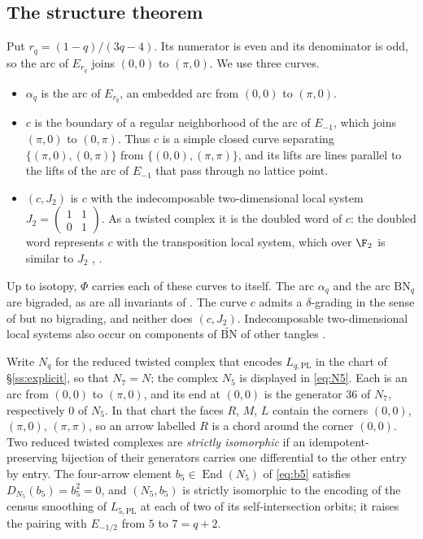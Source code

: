 \subsection{The structure theorem}\label{ss:kh-structure}
Put $r_q=(1-q)/(3q-4)$.  Its numerator is even and its denominator is odd, so the arc of $E_{r_q}$
joins $(0,0)$ to $(\pi,0)$.  We use three curves.
\begin{itemize}
\item $\alpha_q$ is the arc of $E_{r_q}$, an embedded arc from $(0,0)$ to $(\pi,0)$.
\item $c$ is the boundary of a regular neighborhood of the arc of $E_{-1}$, which joins $(\pi,0)$ to
 $(0,\pi)$.  Thus $c$ is a simple closed curve separating $\{(\pi,0),(0,\pi)\}$ from
 $\{(0,0),(\pi,\pi)\}$, and its lifts are lines parallel to the lifts of the arc of $E_{-1}$ that
 pass through no lattice point.
\item $(c,J_2)$ is $c$ with the indecomposable two-dimensional local system
 $J_2=\left(\begin{smallmatrix}1&1\\0&1\end{smallmatrix}\right)$.  As a twisted complex it is the
 doubled word of $c$: the doubled word represents $c$ with the transposition local system, which over
 $\F_2$ is similar to $J_2$ \cite[\S5.3]{KWZ}, \cite[Lem.~2.24]{AurouxSmith}.
\end{itemize}
Up to isotopy, $\Phi$ carries each of these curves to itself.  The arc $\alpha_q$ and the arc
$\mathrm{BN}_q$ are bigraded, as are all invariants of \cite{KWZ}.  The curve $c$ admits a
$\delta$-grading in the sense of \cite[Def.~4.44]{Zibrowius} but no bigrading, and neither does
$(c,J_2)$.  Indecomposable two-dimensional local systems also occur on components of
$\widetilde{\mathrm{BN}}$ of other tangles \cite[Rem.~3.20]{KWZmut}.

Write $N_q$ for the reduced twisted complex that encodes $L_{q,\mathrm{PL}}$ in the chart of
\S\ref{ss:explicit}, so that $N_7=N$; the complex $N_5$ is displayed in \eqref{eq:N5}.  Each is an arc
from $(0,0)$ to $(\pi,0)$, and its end at $(0,0)$ is the generator $36$ of $N_7$, respectively $0$ of
$N_5$.  In that chart the faces $R$, $M$, $L$ contain the corners $(0,0)$, $(\pi,0)$, $(\pi,\pi)$, so
an arrow labelled $R$ is a chord around the corner $(0,0)$.  Two reduced twisted complexes are
\emph{strictly isomorphic} if an idempotent-preserving bijection of their generators carries one
differential to the other entry by entry.  The four-arrow element $b_5\in\operatorname{End}(N_5)$ of
\eqref{eq:b5} satisfies $D_{N_5}(b_5)=b_5^2=0$, and $(N_5,b_5)$ is strictly isomorphic to the encoding
of the census smoothing of $L_{5,\mathrm{PL}}$ at each of two of its self-intersection orbits; it
raises the pairing with $E_{-1/2}$ from $5$ to $7=q+2$.

